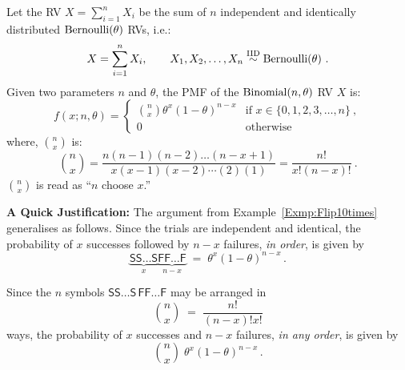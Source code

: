\begin{model}\label{M:binomial}
Let the RV $X=\sum_{i=1}^n X_i$ be the sum of $n$ independent and identically distributed $\mbox{{\rm Bernoulli}}(\theta)$ RVs, i.e.:
\[
X=\sum_{i=1}^n X_i, \qquad X_1,X_2,\ldots,X_n \overset{{\rm IID}}{\sim} \mbox{{\rm Bernoulli}}(\theta) \ .
\]
Given two parameters $n$ and $\theta$, the PMF of the $\mbox{{\rm Binomial}}(n,\theta)$ RV $X$ is:
\begin{equation}
 f(x; n,\theta) =
 \begin{cases}
 \displaystyle\binom{n}{x} \theta^x (1-\theta)^{n-x} & \text{if $x \in \{0,1,2,3,\ldots,n\}$} \ ,\\
 0 & \text{otherwise}
 \end{cases}
 \end{equation}
where, $\binom{n}{x}$ is:
\[
\binom{n}{x} = \frac{n(n-1)(n-2)\ldots(n-x+1)}{x(x-1)(x-2)\cdots (2)(1)} =  \frac{n !}{x! (n-x)!} \ .
 \]
$\binom{n}{x}$ is read as ``$n$ choose $x$.''
 \end{model}
{\bf A Quick Justification:}  The argument from Example~\ref{Exmp:Flip10times} generalises as follows.  
Since the trials are independent and identical, the probability of $x$ successes followed by $n-x$ failures,
\emph{in order},  is
given by
\[\underbrace{\mathsf{SS} \dots \mathsf{S}}_{x}\underbrace{\mathsf{FF} \dots \mathsf{F}}_{n-x}\;=\;\theta^x (1-\theta)^{n-x} \,.\]


Since the $n$ symbols $\mathsf{S S} \dots \mathsf{S} \,\mathsf{F F} \dots \mathsf{F}$ may be arranged in
\[\displaystyle\binom{n}{x} \;=\; \frac{n!}{(n-x)! x!}\]
ways, the probability of  $x$ successes and  $n-x$ failures,
\emph{in any order},  is
given by
\[\displaystyle\binom{n}{x}\;\theta^x (1-\theta)^{n-x}\,.\]

